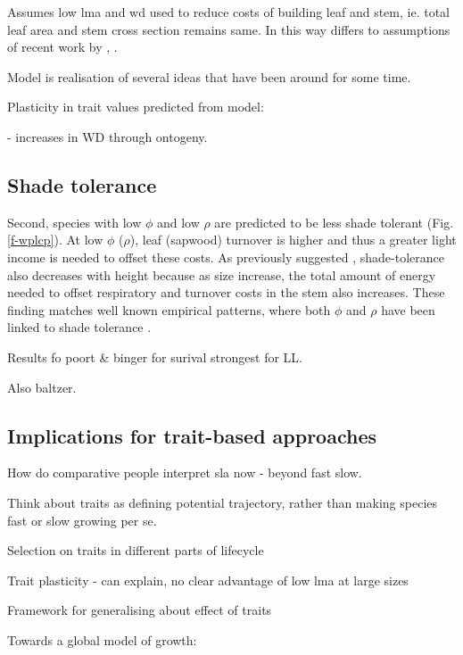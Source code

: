 \documentclass[a4paper,11pt]{article}
\begin{document}
Assumes low lma and wd used to reduce costs of building leaf and stem,
ie. total leaf area and stem cross section remains same. In this way
differs to assumptions of recent work by \citep{Anten-2010}, \citep{Larjavaara-2010}.

Model is realisation of several ideas that have been around for some
time.

Plasticity in trait values predicted from model:

\citep{Osazuwa-2014} - increases in WD through ontogeny.

\subsection{Shade tolerance}\label{shade-tolerance}

Second, species with low $\phi$ and low $\rho$ are predicted to be
less shade tolerant (Fig. \ref{f-wplcp}). At low $\phi$ ($\rho$),
leaf (sapwood) turnover is higher and thus a greater light income is
needed to offset these costs. As previously suggested
 \citep{Givnish-1988}, shade-tolerance also decreases with
height because as size increase, the total amount of energy needed to
offset respiratory and turnover costs in the stem also increases. These
finding matches well known empirical patterns, where both $\phi$ and
$\rho$ have been linked to shade tolerance \citep{Poorter-2006, Lusk-2008,Osunkoya-1996}.

Results fo poort \& binger for surival strongest for LL.

Also baltzer.

\subsection{Implications for trait-based approaches}\label{implications-for-trait-based-approaches}

How do comparative people interpret sla now - beyond fast slow.

Think about traits as defining potential trajectory, rather than making
species fast or slow growing per se.

Selection on traits in different parts of lifecycle

Trait plasticity - can explain, no clear advantage of low lma at large
sizes

Framework for generalising about effect of traits


Towards a global model of growth:
\end{document}
